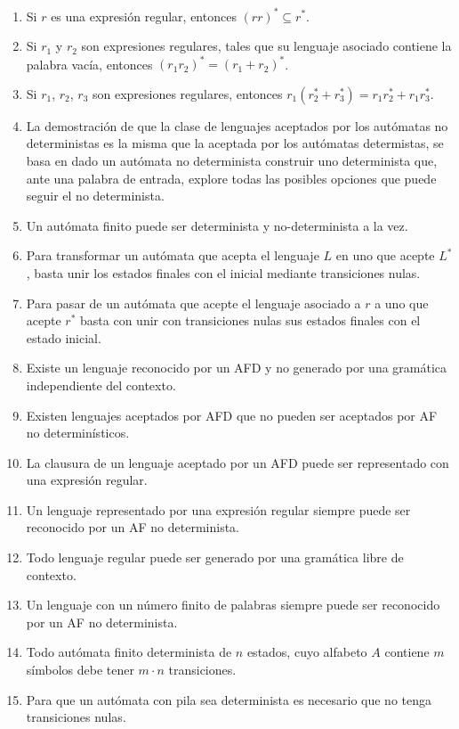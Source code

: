 \begin{enumerate}
    \item Si $r$ es una expresión regular, entonces ${(rr)}^{\ast}\subseteq r^\ast$.
    \item Si $r_1$ y $r_2$ son expresiones regulares, tales que su lenguaje asociado contiene la palabra vacía, entonces ${(r_1r_2)}^{\ast}={(r_1+r_2)}^{\ast}$.
    \item Si $r_1$, $r_2$, $r_3$ son expresiones regulares, entonces $r_1(r_2^\ast + r_3^\ast) = r_1r_2^\ast + r_1r_3^\ast$.
    \item La demostración de que la clase de lenguajes aceptados por los autómatas no deterministas es la misma que la aceptada por los autómatas determistas, se basa en dado un autómata no determinista construir uno determinista que, ante una palabra de entrada, explore todas las posibles opciones que puede seguir el no determinista.
    \item Un autómata finito puede ser determinista y no-determinista a la vez.
    \item Para transformar un autómata que acepta el lenguaje $L$ en uno que acepte $L^\ast$, basta unir los estados finales con el inicial mediante transiciones nulas.
    \item Para pasar de un autómata que acepte el lenguaje asociado a $r$ a uno que acepte $r^\ast$ basta con unir con transiciones nulas sus estados finales con el estado inicial.
    \item Existe un lenguaje reconocido por un AFD y no generado por una gramática independiente del contexto.
    \item Existen lenguajes aceptados por AFD que no pueden ser aceptados por AF no determinísticos.
    \item La clausura de un lenguaje aceptado por un AFD puede ser representado con una expresión regular.
    \item Un lenguaje representado por una expresión regular siempre puede ser reconocido por un AF no determinista.
    \item Todo lenguaje regular puede ser generado por una gramática libre de contexto.
    \item Un lenguaje con un número finito de palabras siempre puede ser reconocido por un AF no determinista.
    \item Todo autómata finito determinista de $n$ estados, cuyo alfabeto $A$ contiene $m$ símbolos debe tener $m\cdot n$ transiciones.
    \item Para que un autómata con pila sea determinista es necesario que no tenga transiciones nulas.

\end{enumerate}
